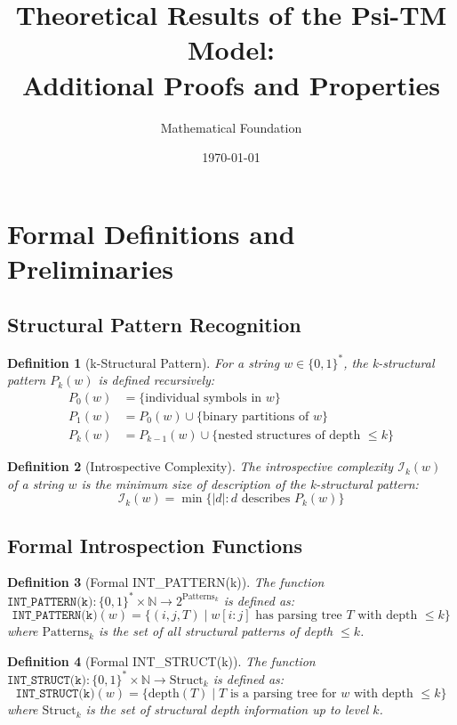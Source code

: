 \documentclass[11pt]{article}
\title{Theoretical Results of the Psi-TM Model:\\
Additional Proofs and Properties}
\author{Mathematical Foundation}
\date{\today}
\newtheorem{definition}{Definition}
\begin{document}
\maketitle

\section{Formal Definitions and Preliminaries}

\subsection{Structural Pattern Recognition}

\begin{definition}[k-Structural Pattern]
For a string $w \in \{0,1\}^*$, the k-structural pattern $P_k(w)$ is defined recursively:
\begin{align*}
P_0(w) &= \{\text{individual symbols in } w\} \\
P_1(w) &= P_0(w) \cup \{\text{binary partitions of } w\} \\
P_k(w) &= P_{k-1}(w) \cup \{\text{nested structures of depth } \leq k\}
\end{align*}
\end{definition}

\begin{definition}[Introspective Complexity]
The introspective complexity $\mathcal{I}_k(w)$ of a string $w$ is the minimum size of description of the k-structural pattern:
$$\mathcal{I}_k(w) = \min\{|d| : d \text{ describes } P_k(w)\}$$
\end{definition}

\subsection{Formal Introspection Functions}

\begin{definition}[Formal INT\_PATTERN(k)]
The function $\texttt{INT\_PATTERN(k)}: \{0,1\}^* \times \mathbb{N} \to 2^{\text{Patterns}_k}$ is defined as:
$$\texttt{INT\_PATTERN(k)}(w) = \{(i,j,T) \mid w[i:j] \text{ has parsing tree } T \text{ with depth } \leq k\}$$
where $\text{Patterns}_k$ is the set of all structural patterns of depth $\leq k$.
\end{definition}

\begin{definition}[Formal INT\_STRUCT(k)]
The function $\texttt{INT\_STRUCT(k)}: \{0,1\}^* \times \mathbb{N} \to \text{Struct}_k$ is defined as:
$$\texttt{INT\_STRUCT(k)}(w) = \{\text{depth}(T) \mid T \text{ is a parsing tree for } w \text{ with depth } \leq k\}$$
where $\text{Struct}_k$ is the set of structural depth information up to level $k$.
\end{definition}
\end{document}
